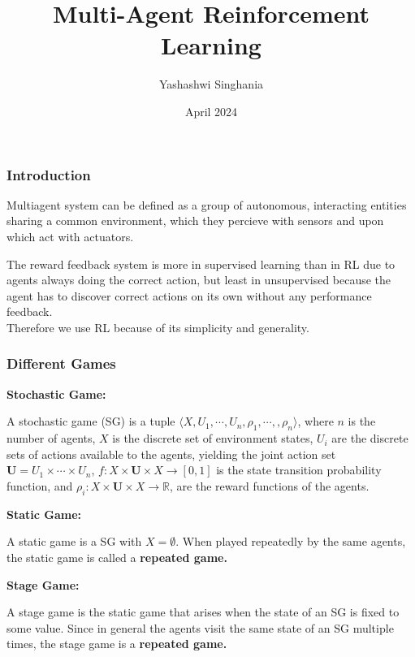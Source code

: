 \documentclass{beamer}
\title{Multi-Agent Reinforcement Learning}
\author{Yashashwi Singhania}
\institute{IIT BHU}
\date{April 2024}
\begin{document}
\frame{\titlepage}

\begin{frame}
\frametitle{Introduction}
Multiagent system can be defined as a group of autonomous, interacting entities sharing a common environment, which they percieve with sensors and upon which act with actuators.\vspace{12pt}

The reward feedback system is more in supervised learning than in RL due to agents always doing the correct action, but least in unsupervised because the agent has to discover correct actions on its own without any performance feedback.\\
Therefore we use RL because of its simplicity and generality.
\end{frame}


\begin{frame}
\frametitle{Different Games}
\textbf{\large Stochastic Game:}

A stochastic game (SG) is a tuple $\langle\mathit{X,U_{1},\cdots,U_{n}},\rho_1,\cdots,,\rho_{n}\rangle$, where $n$ is the number of agents, $\mathit{X}$ is the discrete set of environment states, $\mathit{U_{i}}$ are the discrete sets of actions available to the agents, yielding the joint action set $\mathit{\textbf{U} = U_1 \times \cdots \times U_{n}}$, $\mathit{f:X\times \textbf{U} \times X \rightarrow [0,1]}$ is the state transition probability function, and $\rho_i:\mathit{X\times \textbf{U} \times X \rightarrow \mathbb{R}}$, are the reward functions of the agents. 

\textbf{\large Static Game:}

A static game is a SG with $\mathit{X=\emptyset}.$ When played repeatedly by the same agents, the static game
is called a \textbf{repeated game.}

\textbf{\large Stage Game:}

A stage
game is the static game that arises when the state of an SG is
fixed to some value. Since in general the agents visit the same state of an SG
multiple times, the stage game is a \textbf{repeated game.}
\end{frame}
\end{document}
